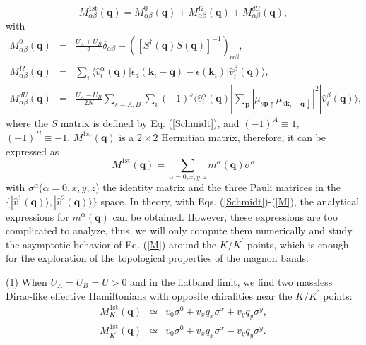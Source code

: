 \documentclass[amsmath,superscriptaddress,showpacs,aps,prl,twocolumn]{revtex4-1}
\begin{document}
\begin{equation}\label{Effective1st}
M^{\text{1st}}_{\alpha\beta}(\mathbf{q})=M^0_{\alpha\beta}(\mathbf{q})+M^\Omega_{\alpha\beta}(\mathbf{q})+M^{dU}_{\alpha\beta}(\mathbf{q}),
\end{equation}
with
\begin{eqnarray}
M^0_{\alpha\beta}(\mathbf{q}) &=& \frac{U_A+U_B}{2}\delta_{\alpha\beta}+\left(\left[S^\dagger(\mathbf{q}) S(\mathbf{q})\right]^{-1}\right)_{\alpha\beta}, \\
M^\Omega_{\alpha\beta}(\mathbf{q}) &=& \sum_i\langle\hat{v}^\alpha_i(\mathbf{q})
                                     |\epsilon_d(\mathbf{k}_i-\mathbf{q})-\epsilon(\mathbf{k}_i)|
                                     \hat{v}^\beta_i(\mathbf{q})\rangle, \\
M^{dU}_{\alpha\beta}(\mathbf{q}) &=& \frac{U_A-U_B}{2N}\sum_{s=A,B}\sum_i(-1)^s\langle\hat{v}^\alpha_i(\mathbf{q})
                                 |\sum_{\mathbf{p}}\left|\mu_{s\mathbf{p}\uparrow}\mu_{s\mathbf{k}_{i}-\mathbf{q}\downarrow}\right|^2|
                                 \hat{v}^\beta_i(\mathbf{q})\rangle,
\end{eqnarray}
where the $S$ matrix is defined by Eq. (\ref{Schmidt}), and $(-1)^A\equiv1$, $(-1)^B\equiv-1$. $M^{\text{1st}}(\mathbf{q})$ is a $2\times2$ Hermitian matrix, therefore, it can be expressed as
\begin{equation}\label{M}
M^{\text{1st}}(\mathbf{q})=\sum_{\alpha=0,x,y,z}m^\alpha(\mathbf{q})\sigma^\alpha
\end{equation}
with $\sigma^\alpha$($\alpha=0,x,y,z$) the identity matrix and the three Pauli matrices in the $\{|\hat{v}^1(\mathbf{q})\rangle,|\hat{v}^2(\mathbf{q})\rangle\}$ space. In theory, with Eqs. (\ref{Schmidt})-(\ref{M}), the analytical expressions for $m^\alpha(\mathbf{q})$ can be obtained. However, these expressions are too complicated to analyze, thus, we will only compute them numerically and study the asymptotic behavior of Eq. (\ref{M}) around the $K/K^\prime$ points, which is enough for the exploration of the topological properties of the magnon bands.
\par (1) When $U_A=U_B=U>0$ and in the flatband limit, we find two massless Dirac-like effective Hamiltonians with opposite chiralities near the $K/K^\prime$ points:
\begin{eqnarray*}
M^{\text{1st}}_K(\mathbf{q})          &\simeq& v_0\sigma^0+v_xq_x\sigma^x+v_yq_y\sigma^y, \\
M^{\text{1st}}_{K^\prime}(\mathbf{q}) &\simeq& v_0\sigma^0+v_xq_x\sigma^x-v_yq_y\sigma^y.
\end{eqnarray*}
\end{document}
